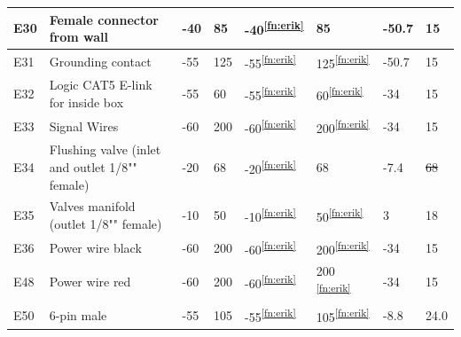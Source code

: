 \documentclass[a4paper,12pt,oneside]{article}
\providecommand{\DIFaddtex}[1]{{\protect\color{blue}\uwave{#1}}} %
\providecommand{\DIFdeltex}[1]{{\protect\color{red}\sout{#1}}}                      %
\providecommand{\DIFaddbegin}{} %
\providecommand{\DIFaddend}{} %
\providecommand{\DIFdelbegin}{} %
\providecommand{\DIFdelend}{} %
\providecommand{\DIFadd}[1]{\texorpdfstring{\DIFaddtex{#1}}{#1}} %
\providecommand{\DIFdel}[1]{\texorpdfstring{\DIFdeltex{#1}}{}} %
\newcommand{\DIFscaledelfig}{0.5}
\newlength{\DIFdelgraphicswidth} %
\newlength{\DIFdelgraphicsheight} %
\newcommand{\DIFaddincludegraphics}[2][]{{\color{blue}\fbox{\DIFOincludegraphics[#1]{#2}}}} %
\newcommand{\DIFdelincludegraphics}[2][]{%
\sbox{\DIFdelgraphicsbox}{\DIFOincludegraphics[#1]{#2}}%
\settoboxwidth{\DIFdelgraphicswidth}{\DIFdelgraphicsbox} %
\settoboxtotalheight{\DIFdelgraphicsheight}{\DIFdelgraphicsbox} %
\scalebox{\DIFscaledelfig}{%
\parbox[b]{\DIFdelgraphicswidth}{\usebox{\DIFdelgraphicsbox}\\[-\baselineskip] \rule{\DIFdelgraphicswidth}{0em}}\llap{\resizebox{\DIFdelgraphicswidth}{\DIFdelgraphicsheight}{%
\setlength{\unitlength}{\DIFdelgraphicswidth}%
\begin{picture}(1,1)%
\thicklines\linethickness{2pt} %
{\color[rgb]{1,0,0}\put(0,0){\framebox(1,1){}}}%
{\color[rgb]{1,0,0}\put(0,0){\line( 1,1){1}}}%
{\color[rgb]{1,0,0}\put(0,1){\line(1,-1){1}}}%
\end{picture}%
}\hspace*{3pt}}} %
} %
\DeclareRobustCommand{\DIFaddbegin}{\DIFOaddbegin \let\includegraphics\DIFaddincludegraphics} %
\DeclareRobustCommand{\DIFaddend}{\DIFOaddend \let\includegraphics\DIFOincludegraphics} %
\DeclareRobustCommand{\DIFdelbegin}{\DIFOdelbegin \let\includegraphics\DIFdelincludegraphics} %
\DeclareRobustCommand{\DIFdelend}{\DIFOaddend \let\includegraphics\DIFOincludegraphics} %
\begin{document}
\begin{appendices}
\begin{longtable}{|m{1cm}|m{3.5cm}|m{1.3cm}|m{1.3cm}|m{1.4cm}|m{1.3cm}|m{1.3cm}|m{1.3cm}|}
E30 & Female connector from wall & -40 & 85 & -40\textsuperscript{\ref{fn:erik}} & 85 & -50.7 & 15 \\ \hline
E31 & Grounding contact & -55 & 125 & -55\textsuperscript{\ref{fn:erik}} & 125\textsuperscript{\ref{fn:erik}} & -50.7 & 15 \\ \hline
E32 & Logic CAT5 E-link for inside box &-55 & 60 & -55\textsuperscript{\ref{fn:erik}} & 60\textsuperscript{\ref{fn:erik}} & -34 & 15 \\ \hline
E33 & Signal Wires & -60 & 200 & -60\textsuperscript{\ref{fn:erik}} & 200\textsuperscript{\ref{fn:erik}} & -34 & 15 \\ \hline
E34 & Flushing valve (inlet and outlet 1/8"" female) & -20 & 68 & -20\textsuperscript{\ref{fn:erik}} & 68 & -7.4 & \DIFdelbegin \DIFdel{68 }\DIFdelend \DIFaddbegin \DIFadd{25.8 }\DIFaddend \\ \hline
E35 & Valves manifold (outlet 1/8"" female) & -10 & 50 & -10\textsuperscript{\ref{fn:erik}} & 50\textsuperscript{\ref{fn:erik}} & 3 & 18 \\ \hline
E36 & Power wire black & -60 & 200 & -60\textsuperscript{\ref{fn:erik}} & 200\textsuperscript{\ref{fn:erik}} & -34 & 15 \\ \hline
E48 & Power wire red & -60 & 200 & -60\textsuperscript{\ref{fn:erik}} & 200
\textsuperscript{\ref{fn:erik}} & -34 & 15  \\ \hline
E50 & 6-pin male & -55 & 105 & -55\textsuperscript{\ref{fn:erik}} & 105\textsuperscript{\ref{fn:erik}} & -8.8 & 24.0  \\ \hline

\end{longtable}
\end{appendices}
\end{document}
